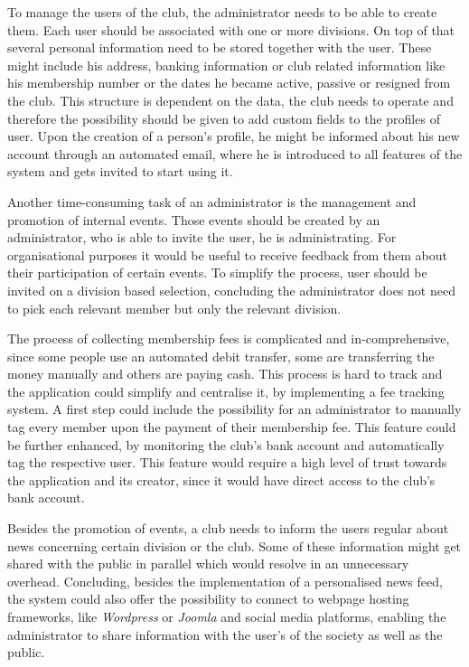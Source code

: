 To manage the users of the club, the administrator needs to be able to create them. Each user should be associated with one or more divisions. On top of that several personal information need to be stored together with the user. These might include his address, banking information or club related information like his membership number or the dates he became active, passive or resigned from the club. This structure is dependent on the data, the club needs to operate and therefore the possibility should be given to add custom fields to the profiles of user. Upon the creation of a person's profile, he might be informed about his new account through an automated email, where he is introduced to all features of the system and gets invited to start using it.

Another time-consuming task of an administrator is the management and promotion of internal events. Those events should be created by an administrator, who is able to invite the user, he is administrating. For organisational purposes it would be useful to receive feedback from them about their participation of certain events. To simplify the process, user should be invited on a division based selection, concluding the administrator does not need to pick each relevant member but only the relevant division.

The process of collecting membership fees is complicated and in-comprehensive, since some people use an automated debit transfer, some are transferring the money manually and others are paying cash. This process is hard to track and the application could simplify and centralise it, by implementing a fee tracking system. A first step could include the possibility for an administrator to manually tag every member upon the payment of their membership fee. This feature could be further enhanced, by monitoring the club's bank account and automatically tag the respective user. This feature would require a high level of trust towards the application and its creator, since it would have direct access to the club's bank account.

Besides the promotion of events, a club needs to inform the users regular about news concerning certain division or the club. Some of these information might get shared with the public in parallel which would resolve in an unnecessary overhead. Concluding, besides the implementation of a personalised news feed, the system could also offer the possibility to connect to webpage hosting frameworks, like \emph{Wordpress} or \emph{Joomla} and social media platforms, enabling the administrator to share information with the user's of the society as well as the public.


